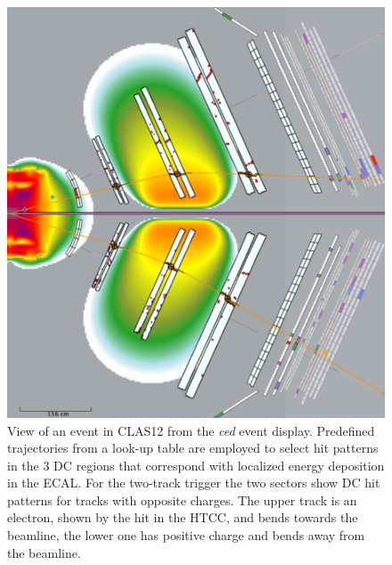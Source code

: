 \documentclass[final,3p,twocolumn]{elsarticle}
\begin{document}
\begin{figure}[t!]
\centerline{\includegraphics[width=0.95\columnwidth]{trigger.png}}
\caption{View of an event in CLAS12 from the {\it ced} event display. Predefined trajectories from a look-up
  table are employed to select hit patterns in the 3 DC regions that correspond with localized energy deposition
  in the ECAL. For the two-track trigger the two sectors show DC hit patterns for tracks with opposite charges.
  The upper track is an electron, shown by the hit in the HTCC, and bends towards the beamline, the lower one
  has positive charge and bends away from the beamline.}
\label{trigger}
\end{figure}
\end{document}
